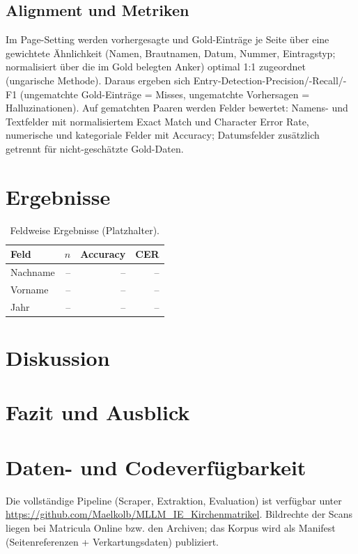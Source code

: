 \documentclass[11pt,a4paper]{article}
\begin{document}
\subsection{Alignment und Metriken}
Im Page-Setting werden vorhergesagte und Gold-Einträge je Seite über eine
gewichtete Ähnlichkeit (Namen, Brautnamen, Datum, Nummer, Eintragstyp;
normalisiert über die im Gold belegten Anker) optimal 1:1 zugeordnet
(ungarische Methode). Daraus ergeben sich Entry-Detection-Precision/-Recall/-F1
(ungematchte Gold-Einträge = Misses, ungematchte Vorhersagen =
Halluzinationen). Auf gematchten Paaren werden Felder bewertet: Namens- und
Textfelder mit normalisiertem Exact Match und Character Error Rate, numerische
und kategoriale Felder mit Accuracy; Datumsfelder zusätzlich getrennt für
nicht-geschätzte Gold-Daten.

\section{Ergebnisse}
\begin{table}[ht]
\centering
\caption{Feldweise Ergebnisse (Platzhalter).}
\begin{tabular}{lrrr}
\toprule
Feld & $n$ & Accuracy & CER \\
\midrule
Nachname & -- & -- & -- \\
Vorname & -- & -- & -- \\
Jahr & -- & -- & -- \\
\bottomrule
\end{tabular}
\end{table}

\section{Diskussion}

\section{Fazit und Ausblick}

\section*{Daten- und Codeverfügbarkeit}
Die vollständige Pipeline (Scraper, Extraktion, Evaluation) ist verfügbar
unter \url{https://github.com/Maelkolb/MLLM_IE_Kirchenmatrikel}. %
Bildrechte der Scans liegen bei Matricula Online bzw. den Archiven; das
Korpus wird als Manifest (Seitenreferenzen + Verkartungsdaten) publiziert.

\printbibliography
\end{document}
